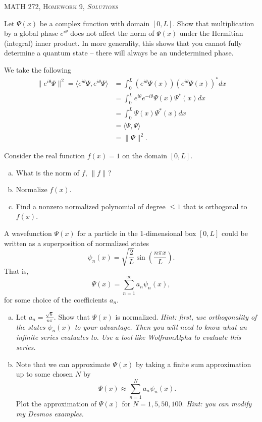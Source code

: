\documentclass[12pt]{article} %
\newcommand{\innprod}[2]{\langle #1, #2 \rangle}
\begin{document}
\begin{center}
   \textsc{\large MATH 272, Homework 9, \emph{Solutions}}\\
\end{center}
\vspace{.5cm}

\begin{problem}
	Let $\Psi(x)$ be a complex function with domain $[0,L]$.  Show that multiplication by a global phase $e^{i\theta}$ does not affect the norm of $\Psi(x)$ under the Hermitian (integral) inner product. In more generality, this shows that you cannot fully determine a quantum state -- there will always be an undetermined phase.
\end{problem}
\begin{solution}
	We take the following
	\begin{align*}
		\|e^{i\theta} \Psi\|^2=\innprod{e^{i\theta}\Psi}{e^{i\theta}\Psi} &= \int_0^L \left(e^{i\theta}\Psi(x)\right)\left(e^{i\theta}\Psi(x)\right)^*dx\\
		&= \int_0^L e^{i\theta}e^{-i\theta} \Psi(x)\Psi^*(x)dx\\
		&= \int_0^L \Psi(x)\Psi^*(x)dx\\
		&= \innprod{\Psi}{\Psi}\\
		&= \|\Psi\|^2.
	\end{align*}
\end{solution}

\newpage
\begin{problem}
	Consider the real function $f(x)=1$ on the domain $[0,L]$.
	\begin{enumerate}[(a)]
		\item What is the norm of $f$, $\|f\|$?
		\item Normalize $f(x)$.
		\item Find a nonzero normalized polynomial of degree $\leq 1$ that is orthogonal to $f(x)$.
	\end{enumerate}
\end{problem}


\newpage
\begin{problem}
	A wavefunction $\Psi(x)$ for a particle in the 1-dimensional box $[0,L]$ could be written as a superposition of normalized states
	\[
	\psi_n(x) = \sqrt{\frac{2}{L}} \sin\left(\frac{n\pi x}{L}\right).
	\]
	That is,
	\[
	\Psi(x) = \sum_{n=1}^\infty a_n \psi_n(x),
	\]
	for some choice of the coefficients $a_n$.
	\begin{enumerate}[(a)]
		\item Let $a_n = \frac{\sqrt{6}}{n\pi}$. Show that $\Psi(x)$ is normalized. \emph{Hint: first, use orthogonality of the states $\psi_n(x)$ to your advantage. Then you will need to know what an infinite series evaluates to. Use a tool like WolframAlpha to evaluate this series.}
		\item Note that we can approximate $\Psi(x)$ by taking a finite sum approximation up to some chosen $N$ by
		\[
			\Psi(x) \approx \sum_{n=1}^N a_n \psi_n(x).
		\]
		Plot the approximation of $\Psi(x)$ for $N=1,5,50,100$.  \emph{Hint: you can modify my Desmos examples.}
		\end{enumerate}
\end{problem}
\end{document}
